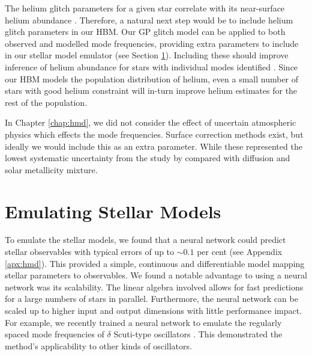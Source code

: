 The helium glitch parameters for a given star correlate with its near-surface helium abundance \citep{Houdek.Gough2007}. Therefore, a natural next step would be to include helium glitch parameters in our HBM. Our GP glitch model can be applied to both observed and modelled mode frequencies, providing extra parameters to include in our stellar model emulator (see Section \ref{sec:conc-nn}). Including these should improve inference of helium abundance for stars with individual modes identified \citep[e.g.][]{Davies.SilvaAguirre.ea2016,Lund.SilvaAguirre.ea2017}. Since our HBM models the population distribution of helium, even a small number of stars with good helium constraint will in-turn improve helium estimates for the rest of the population.


In Chapter \ref{chap:hmd}, we did not consider the effect of uncertain atmospheric physics which effects the mode frequencies. Surface correction methods exist, but ideally we would include this as an extra parameter. While these represented the lowest systematic uncertainty from the study by \citet{Nsamba.Campante.ea2018} compared with diffusion and solar metallicity mixture.


\section{Emulating Stellar Models}\label{sec:conc-nn}

To emulate the stellar models, we found that a neural network could predict stellar observables with typical errors of up to \(\sim 0.1\) per cent (see Appendix \ref{apx:hmd}). This provided a simple, continuous and differentiable model mapping stellar parameters to observables. We found a notable advantage to using a neural network was its scalability. The linear algebra involved allows for fast predictions for a large numbers of stars in parallel. Furthermore, the neural network can be scaled up to higher input and output dimensions with little performance impact. For example, we recently trained a neural network to emulate the regularly spaced mode frequencies of \(\delta\) Scuti-type oscillators \citep{Scutt.Murphy.ea2023}. This demonstrated the method's applicability to other kinds of oscillators.

